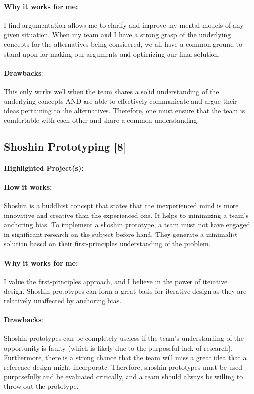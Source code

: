 \documentclass[a4paper,12pt]{article}
\begin{document}
\paragraph{Why it works for me: }
I find argumentation allows me to clarify and improve my mental models of any given situation. When my team and I have a strong grasp of the underlying concepts for the alternatives being considered, we all have a common ground to stand upon for making our arguments and optimizing our final solution.

\paragraph{Drawbacks: }
This only works well when the team shares a solid understanding of the underlying concepts AND are able to effectively communicate and argue their ideas pertaining to the alternatives. Therefore, one must ensure that the team is comfortable with each other and share a common understanding.

\subsection{Shoshin Prototyping [8]}
\paragraph{Highlighted Project(s): }
\paragraph{How it works: }
Shoshin is a buddhist concept that states that the inexperienced mind is more innovative and creative than the experienced one. It helps to minimizing a team’s anchoring bias. To implement a shoshin prototype, a team must not have engaged in significant research on the subject before hand. They generate a minimalist solution based on their first-principles understanding of the problem.

\paragraph{Why it works for me: }
I value the first-principles approach, and I believe in the power of iterative design. Shoshin prototypes can form a great basis for iterative design as they are relatively unaffected by anchoring bias.

\paragraph{Drawbacks: }
Shoshin prototypes can be completely useless if the team’s understanding of the opportunity is faulty (which is likely due to the purposeful lack of research). Furthermore, there is a strong chance that the team will miss a great idea that a reference design might incorporate. Therefore, shoshin prototypes must be used purposefully and be evaluated critically, and a team should always be willing to throw out the prototype.
\end{document}
